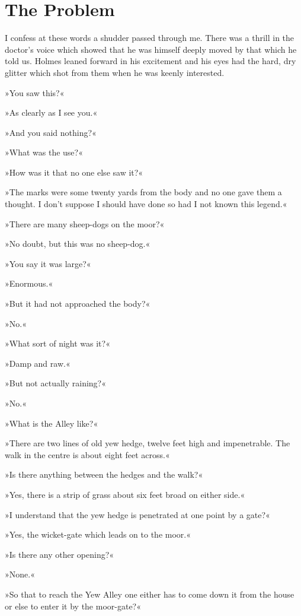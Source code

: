 \chapter{The Problem}
\lettrine[lines=1]{I}{} confess at these words a shudder passed through me. There was a thrill in the doctor's voice which showed that he was himself deeply moved by that which he told us. Holmes leaned forward in his excitement and his eyes had the hard, dry glitter which shot from them when he was keenly interested.

»You saw this?«

»As clearly as I see you.«

»And you said nothing?«

»What was the use?«

»How was it that no one else saw it?«

»The marks were some twenty yards from the body and no one gave them a thought. I don't suppose I should have done so had I not known this legend.«

»There are many sheep-dogs on the moor?«

»No doubt, but this was no sheep-dog.«

»You say it was large?«

»Enormous.«

»But it had not approached the body?«

»No.«

»What sort of night was it?«

»Damp and raw.«

»But not actually raining?«

»No.«

»What is the Alley like?«

»There are two lines of old yew hedge, twelve feet high and impenetrable. The walk in the centre is about eight feet across.«

»Is there anything between the hedges and the walk?«

»Yes, there is a strip of grass about six feet broad on either side.«

»I understand that the yew hedge is penetrated at one point by a gate?«

»Yes, the wicket-gate which leads on to the moor.«

»Is there any other opening?«

»None.«

»So that to reach the Yew Alley one either has to come down it from the house or else to enter it by the moor-gate?«

